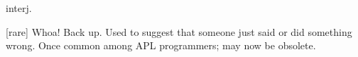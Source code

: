  interj.

[rare] Whoa! Back up. Used to suggest that someone just said or did something
wrong. Once common among APL programmers; may now be obsolete.

